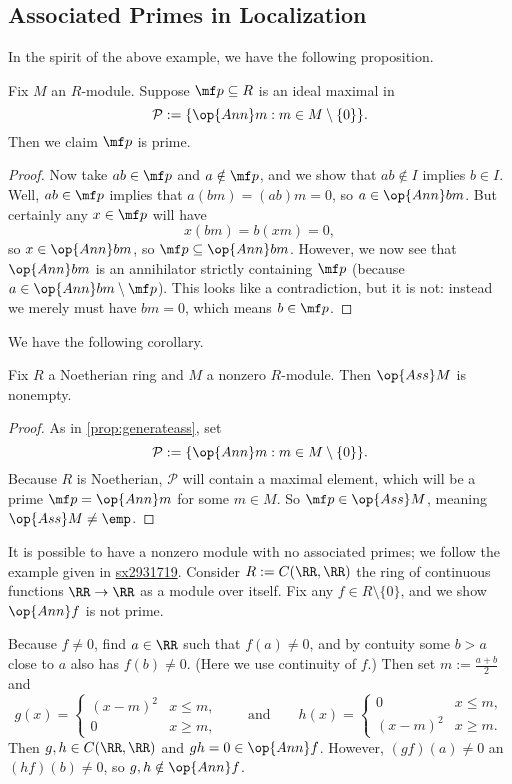 \subsection{Associated Primes in Localization}
In the spirit of the above example, we have the following proposition.
\begin{proposition} \label{prop:generateass}
	Fix $M$ an $R$-module. Suppose $\mf p\subseteq R$ is an ideal maximal in
	\[\mathcal P:=\{\op{Ann}m:m\in M\setminus\{0\}\}.\]
	Then we claim $\mf p$ is prime.
\end{proposition}
\begin{proof}
	Now take $ab\in\mf p$ and $a\notin\mf p$, and we show that $ab\notin I$ implies $b\in I$. Well, $ab\in\mf p$ implies that $a(bm)=(ab)m=0$, so $a\in\op{Ann}bm$. But certainly any $x\in\mf p$ will have
	\[x(bm)=b(xm)=0,\]
	so $x\in\op{Ann}bm$, so $\mf p\subseteq\op{Ann}bm$. However, we now see that $\op{Ann}bm$ is an annihilator strictly containing $\mf p$ (because $a\in\op{Ann}bm\setminus\mf p$). This looks like a contradiction, but it is not: instead we merely must have $bm=0$, which means $b\in\mf p$.
\end{proof}
We have the following corollary.
\begin{corollary}
	Fix $R$ a Noetherian ring and $M$ a nonzero $R$-module. Then $\op{Ass}M$ is nonempty.
\end{corollary}
\begin{proof}
	As in \autoref{prop:generateass}, set
	\[\mathcal P:=\{\op{Ann}m:m\in M\setminus\{0\}\}.\]
	Because $R$ is Noetherian, $\mathcal P$ will contain a maximal element, which will be a prime $\mf p=\op{Ann}m$ for some $m\in M$. So $\mf p\in\op{Ass}M$, meaning $\op{Ass}M\ne\emp$.
\end{proof}
\begin{remark}[Nir]
	It is possible to have a nonzero module with no associated primes; we follow the example given in \href{https://math.stackexchange.com/a/3365952/869257}{sx2931719}. Consider $R:=C(\RR,\RR)$ the ring of continuous functions $\RR\to\RR$ as a module over itself. Fix any $f\in R\setminus\{0\}$, and we show $\op{Ann}f$ is not prime.

	Because $f\ne0$, find $a\in\RR$ such that $f(a)\ne0$, and by contuity some $b>a$ close to $a$ also has $f(b)\ne0$. (Here we use continuity of $f$.) Then set $m:=\frac{a+b}2$ and
	\[g(x)=\begin{cases}
		(x-m)^2 & x \le m, \\
		0 & x \ge m,
	\end{cases}\qquad\text{and}\qquad h(x)=\begin{cases}
		0 & x \le m, \\
		(x-m)^2 & x \ge m.
	\end{cases}\]
	Then $g,h\in C(\RR,\RR)$ and $gh=0\in\op{Ann}f$. However, $(gf)(a)\ne0$ an $(hf)(b)\ne0$, so $g,h\notin\op{Ann}f$.
\end{remark}

